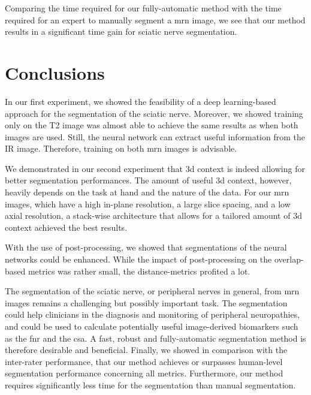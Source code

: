 Comparing the time required for our fully-automatic method with the time required for an expert to manually segment a \gls{mrn} image, we see that our method results in a significant time gain for sciatic nerve segmentation.

\section{Conclusions} \label{disc:conclusions}
In our first experiment, we showed the feasibility of a deep learning-based approach for the segmentation of the sciatic nerve. Moreover, we showed training only on the T2 image was almost able to achieve the same results as when both images are used. Still, the neural network can extract useful information from the IR image. Therefore, training on both \gls{mrn} images is advisable.

We demonstrated in our second experiment that \gls{3d} context is indeed allowing for better segmentation performances. The amount of useful \gls{3d} context, however, heavily depends on the task at hand and the nature of the data. For our \gls{mrn} images, which have a high in-plane resolution, a large slice spacing, and a low axial resolution, a stack-wise architecture that allows for a tailored amount of \gls{3d} context achieved the best results.

With the use of post-processing, we showed that segmentations of the neural networks could be enhanced. While the impact of post-processing on the overlap-based metrics was rather small, the distance-metrics profited a lot.

The segmentation of the sciatic nerve, or peripheral nerves in general, from \gls{mrn} images remains a challenging but possibly important task. The segmentation could help clinicians in the diagnosis and monitoring of peripheral neuropathies, and could be used to calculate potentially useful image-derived biomarkers such as the \gls{fnr} and the \gls{csa}. A fast, robust and fully-automatic segmentation method is therefore desirable and beneficial. Finally, we showed in comparison with the inter-rater performance, that our method achieves or surpasses human-level segmentation performance concerning all metrics. Furthermore, our method requires significantly less time for the segmentation than manual segmentation.

\endinput